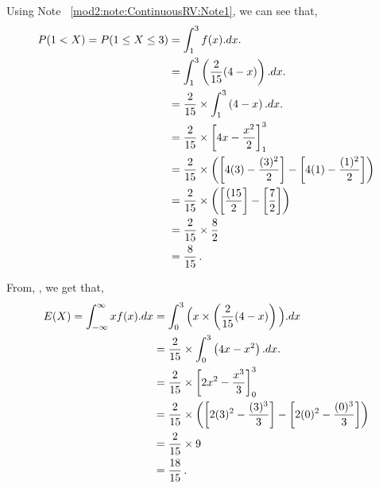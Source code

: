 \begin{subquestions}
\begin{subsubquestions}

\subsubquestion

Using Note ~\ref{mod2:note:ContinuousRV:Note1}, we can see that,
\begin{align}
	P(1<X) = P(1 \leq X \leq 3) & = \int_1^3 f(x).dx. \nonumber \\
	& = \int_1^3 \left(\frac{2}{15}(4-x)\right).dx. \nonumber \\
	& = \frac{2}{15} \times \int_1^3 \left(4-x\right).dx. \nonumber \\
	& = \frac{2}{15} \times \left[ 4x- \frac{x^2}{2}\right]^3_1 \nonumber \\
	& = \frac{2}{15} \times \left( \left[ 4(3)- \frac{(3)^2}{2}\right] -\left[ 4(1)- \frac{(1)^2}{2}\right] \right) \nonumber \\
	& = \frac{2}{15} \times \left( \left[\frac{(15}{2}\right] -\left[ \frac{7}{2}\right] \right) \nonumber \\
	& = \frac{2}{15} \times \frac{8}{2} \nonumber \\
	& = \frac{8}{15} \,.	
\end{align}
	

\subsubquestion

From, , we get that,
\begin{align}
	E(X) = \int_{-\infty}^{\infty}x f(x).dx & = \int_{0}^{3} \Big(x \times \left( \frac{2}{15}(4-x)\right) \Big).dx \nonumber \\
	                                        & = \frac{2}{15} \times \int_0^3 \left(4x-x^2 \right).dx. \nonumber \\
	                                        & = \frac{2}{15} \times \left[ 2x^2 - \frac{x^3}{3} \right]_0^3 \nonumber \\
	                                        & = \frac{2}{15} \times \left( \left[ 2(3)^2 - \frac{(3)^3}{3} \right] - \left[ 2(0)^2 - \frac{(0)^3}{3} \right] \right) \nonumber \\
	                                        & = \frac{2}{15} \times 9 \nonumber \\
	                                        & = \frac{18}{15} \,.
\end{align}


\subsubquestion


\end{subsubquestions}
\end{subquestions}
